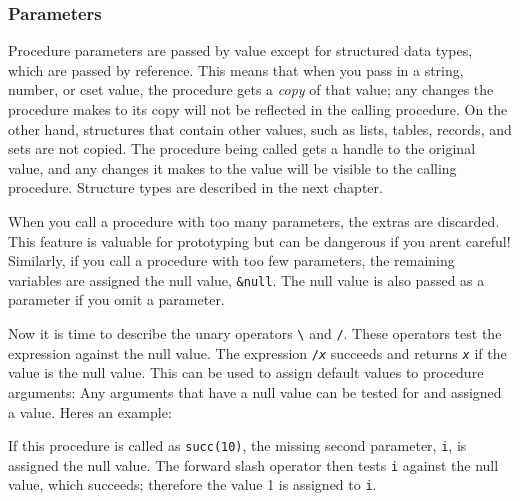 
\subsubsection{Parameters}

Procedure parameters are passed by value except for
structured data types, which are passed by
reference. This means that when you pass in a string,
number, or cset value, the procedure gets a \textit{copy} of that
value; any changes the procedure makes to its copy will not be
reflected in the calling procedure. On the other hand, structures that
contain other values, such as lists, tables, records, and sets are not
copied. The procedure being called gets a handle to the original value,
and any changes it makes to the value will be visible to the calling
procedure. Structure types are described in the next chapter.

When you call a procedure with too many
parameters, the extras are discarded. This feature is valuable for
prototyping but can be dangerous if you aren{\textquotesingle}t
careful! Similarly, if you call a procedure with too few parameters,
the remaining variables are assigned the null value, \texttt{\&null}.
The null value is also passed as a parameter if you omit a parameter.

Now it is time to describe the unary operators \texttt{{\textbackslash}}
and \texttt{/}. These operators test the expression against the null
value. The expression \texttt{/}\texttt{\textit{x}}
succeeds and returns \texttt{\textit{x}} if the value is the null
value. This can be used to assign default values to procedure
arguments: Any arguments that have a null value can be tested for and
assigned a value. Here{\textquotesingle}s an example:


If this procedure is called as \texttt{succ(10)}, the missing second
parameter, \texttt{i}, is assigned the null value. The forward slash
operator then tests \texttt{i} against the null value, which succeeds;
therefore the value 1 is assigned to \texttt{i}.

